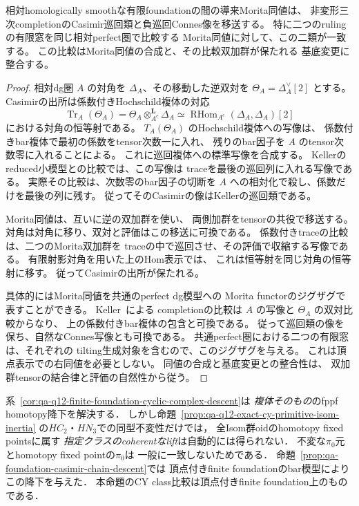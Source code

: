 \begin{proposition}[Casimir類の導来Morita移送]
\label{prop:qa-casimir-morita-transport}
相対homologically smoothな有限foundationの間の導来Morita同値は、
非変形三次completionのCasimir巡回類と負巡回Connes像を移送する。
特に二つのrulingの有限窓を同じ相対perfect圏で比較する
Morita同値に対して、この二類が一致する。
この比較はMorita同値の合成と、その比較双加群が保たれる
基底変更に整合する。
\end{proposition}
\begin{proof}
相対dg圏 $A$ の対角を $\Delta_A$、その移動した逆双対を
$\Theta_A=\Delta_A^\vee[2]$ とする。
Casimirの出所は係数付きHochschild複体の対応
\[
 \operatorname{Tr}_A(\Theta_A)
 =\Theta_A\otimes^{\mathbf L}_{A^e}\Delta_A
 \simeq\operatorname{RHom}_{A^e}(\Delta_A,\Delta_A)[2]
\]
における対角の恒等射である。
$T_A(\Theta_A)$ のHochschild複体への写像は、
係数付きbar複体で最初の係数をtensor次数一に入れ、
残りのbar因子を $A$ のtensor次数零に入れることによる。
これに巡回複体への標準写像を合成する。
Kellerのreduced小模型との比較では、この写像は
traceを最後の巡回列に入れる写像である。
実際その比較は、次数零のbar因子の切断を
$A$ への相対化で殺し、係数だけを最後の列に残す。
従ってそのCasimirの像はKellerの巡回類である。

Morita同値は、互いに逆の双加群を使い、
両側加群をtensorの共役で移送する。
対角は対角に移り、双対と評価はこの移送に可換である。
係数付きtraceの比較は、二つのMorita双加群を
traceの中で巡回させ、その評価で収縮する写像である。
有限射影対角を用いた上のHom表示では、
これは恒等射を同じ対角の恒等射に移す。
従ってCasimirの出所が保たれる。

具体的にはMorita同値を共通のperfect dg模型への
Morita functorのジグザグで表すことができる。
Keller~\cite[Proposition~4.2]{KellerDeformedCY2011}による
completionの比較は $A$ の写像と $\Theta_A$ の双対比較からなり、
上の係数付きbar複体の包含と可換である。
従って巡回類の像を保ち、自然なConnes写像とも可換である。
共通perfect圏における二つの有限窓は、それぞれの
tilting生成対象を含むので、このジグザグを与える。
これは頂点表示での右同値を必要としない。
同値の合成と基底変更との整合性は、
双加群tensorの結合律と評価の自然性から従う。
\end{proof}

\begin{remark}[降下した複体とCYクラスの区別]
\label{rem:qa-q12-cyclic-complex-versus-class-descent}
系~\ref{cor:qa-q12-finite-foundation-cyclic-complex-descent}は
\emph{複体そのもの}のfppf homotopy降下を解決する．
しかし命題~\ref{prop:qa-q12-exact-cy-primitive-isom-inertia}
の$HC_2$・$HN_3$での同型不変性だけでは，
全Isom群oidのhomotopy fixed pointsに属す
\emph{指定クラスのcoherentなlift}は自動的には得られない．
不変な$\pi_0$元とhomotopy fixed pointの$\pi_0$は
一般に一致しないためである．
命題~\ref{prop:qa-foundation-casimir-chain-descent}では
頂点付きfinite foundationのbar模型によりこの降下を与えた．
本命題のCY class比較は頂点付きfinite foundation上のものである．
\end{remark}

